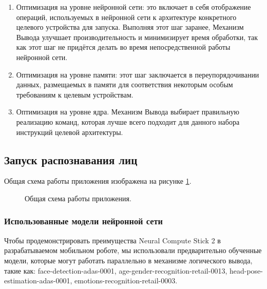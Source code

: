 \documentclass[14pt,a4paper]{scrartcl}
\begin{document}
			\begin{enumerate}
				\item Оптимизация на уровне нейронной сети: это включает в себя отображение операций, используемых в нейронной сети к архитектуре конкретного целевого устройства для запуска. Выполняя этот шаг заранее, Механизм Вывода улучшает производительность и минимизирует время обработки, так как этот шаг не придётся делать во время непосредственной работы нейронной сети.
				\item Оптимизация на уровне памяти: этот шаг заключается в переупорядочивании данных, размещаемых в памяти для соответствия некоторым особым требованиям к целевым устройствам.
				\item Оптимизация на уровне ядра. Механизм Вывода выбирает правильную реализацию команд, которая лучше всего подходит для данного набора инструкций целевой архитектуры.
			\end{enumerate}	
	
	\subsection{Запуск распознавания лиц}
	
		Общая схема работы приложения изображена на рисунке \ref{fig:Integration_Process}\cite{bib:Integrate_IE_New_API}.
		
		\begin{figure}[h]
			\caption{Общая схема работы приложения.}
			\label{fig:Integration_Process}
		\end{figure}
	
		\subsubsection{Использованные модели нейронной сети}
		
			Чтобы продемонстрировать преимущества Neural Compute Stick 2 в разрабатываемом мобильном роботе, мы использовали предварительно обученные модели, которые могут работать параллельно в механизме логического вывода, такие как: face-detection-adas-0001, age-gender-recognition-retail-0013, head-pose-estimation-adas-0001, emotions-recognition-retail-0003.
			
\end{document}
